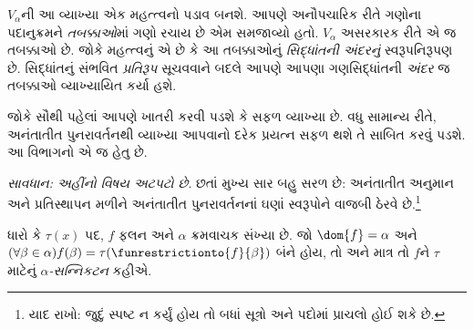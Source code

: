 $V_\alpha$ની આ વ્યાખ્યા એક મહત્ત્વનો પડાવ બનશે. આપણે અનૌપચારિક
રીતે ગણોના પદાનુક્રમને \emph{તબક્કાઓ}માં ગણો રચાય છે એમ
સમજાવ્યો હતો. $V_\alpha$ અસરકારક રીતે એ જ તબક્કાઓ છે. જોકે
મહત્ત્વનું એ છે કે આ તબક્કાઓનું \emph{સિદ્ધાંતની અંદરનું}
સ્વરૂપનિરૂપણ છે. સિદ્ધાંતનું સંભવિત \emph{પ્રતિરૂપ} સૂચવવાને
બદલે આપણે આપણા ગણસિદ્ધાંતની \emph{અંદર} જ તબક્કાઓ
વ્યાખ્યાયિત કર્યા હશે.
\endgroup

\begingroup
\makeatletter{}\makeatother

\label{guunit:OLP-0560}


જોકે સૌથી પહેલાં આપણે ખાતરી કરવી પડશે કે
 સફળ વ્યાખ્યા છે. વધુ સામાન્ય રીતે,
અનંતાતીત પુનરાવર્તનથી વ્યાખ્યા આપવાનો દરેક પ્રયત્ન સફળ થશે તે
સાબિત કરવું પડશે. આ વિભાગનો એ જ હેતુ છે.

\emph{સાવધાન: અહીંનો વિષય અટપટો છે}. છતાં મુખ્ય સાર બહુ સરળ છે:
અનંતાતીત અનુમાન અને પ્રતિસ્થાપન મળીને અનંતાતીત પુનરાવર્તનનાં
ઘણાં સ્વરૂપોને વાજબી ઠેરવે છે.\footnote{યાદ રાખો: જુદું સ્પષ્ટ ન
કર્યું હોય તો બધાં સૂત્રો અને પદોમાં પ્રાચલો હોઈ શકે છે.}

\begin{defn}
	ધારો કે $\tau(x)$ પદ, $f$ ફલન અને $\alpha$ ક્રમવાચક સંખ્યા છે.
	જો $\dom{f} = \alpha$ અને $(\forall \beta \in \alpha)f(\beta) = \tau(\funrestrictionto{f}{\beta})$ બંને હોય,
	તો અને માત્ર તો $f$ને $\tau$ માટેનું \emph{$\alpha$-સન્નિકટન} કહીએ.
\end{defn}

